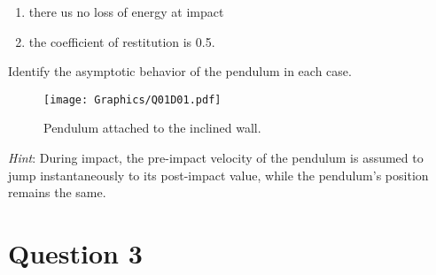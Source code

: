 \documentclass[twoside,10pt,a4paper]{article}
\begin{document}
\begin{enumerate}[label=(\roman*)]
	\item there us no loss of energy at impact
	\item the coefficient of restitution is 0.5.
\end{enumerate}
Identify the asymptotic behavior of the pendulum in each case.

\begin{figure}[H]
	\centering
	\texttt{[image: Graphics/Q01D01.pdf]}
	\caption{Pendulum attached to the inclined wall.}
	\label{Q01D01}
\end{figure}

\textit{Hint}: During impact, the pre-impact velocity of the pendulum is assumed to jump instantaneously to its post-impact value, while the pendulum's position remains the same.

\section*{Question 3}
\end{document}
